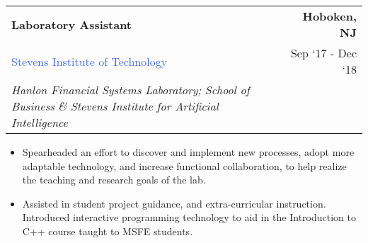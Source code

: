\documentclass[10pt]{article}
\newcommand{\highlightcolor}{RoyalBlue}
\newcommand{\tabularxwidth}{\textwidth}
\begin{document}
    \begin{minipage}{\tabularxwidth}

        \begin{tabularx}{\tabularxwidth}{X r}
            \textbf{Laboratory Assistant} & \textbf{Hoboken, 
        NJ} \\
            
    
    
    
    

    
        \textcolor{\highlightcolor}{Stevens Institute of Technology} & 
        
    Sep ‘17 - 
    Dec ‘18 \\
        
            \textit{Hanlon Financial Systems Laboratory;}
                \textit{School of Business} \textit{\&}
                \textit{Stevens Institute for Artificial Intelligence} & \\
        
    
            
        \end{tabularx}

        \begin{itemize}[noitemsep, topsep=3pt, parsep=0pt, partopsep=0pt]
            
                \item 
    Spearheaded an effort to discover and implement new processes, adopt more adaptable technology, and increase functional collaboration, to help realize the teaching and research goals of the lab.
            
                \item 
    Assisted in student project guidance, and extra-curricular instruction. Introduced interactive programming technology to aid in the Introduction to C++ course taught to MSFE students.
            

\end{itemize}
\end{minipage}
\end{document}
